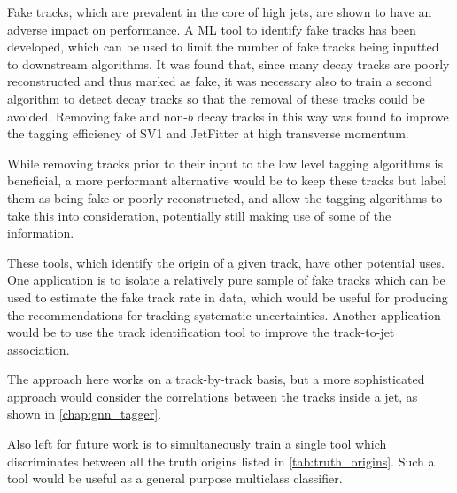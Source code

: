 Fake tracks, which are prevalent in the core of high \pt jets, are shown to have an adverse impact on \btagging performance.
A ML tool to identify fake tracks has been developed, which can be used to limit the number of fake tracks being inputted to downstream \btagging algorithms.
It was found that, since many \bhadron decay tracks are poorly reconstructed and thus marked as fake, it was necessary also to train a second algorithm to detect \bhadron decay tracks so that the removal of these tracks could be avoided.
Removing fake and non-$b$ decay tracks in this way was found to improve the tagging efficiency of SV1 and JetFitter at high transverse momentum.

While removing tracks prior to their input to the low level tagging algorithms is beneficial, a more performant alternative would be to keep these tracks but label them as being fake or poorly reconstructed, and allow the tagging algorithms to take this into consideration, potentially still making use of some of the information.


These tools, which identify the origin of a given track, have other potential uses.
One application is to isolate a relatively pure sample of fake tracks which can be used to estimate the fake track rate in data, which would be useful for producing the recommendations for tracking systematic uncertainties.
Another application would be to use the \bhadron track identification tool to improve the track-to-jet association.

The approach here works on a track-by-track basis, but a more sophisticated approach would consider the correlations between the tracks inside a jet, as shown in \cref{chap:gnn_tagger}.

Also left for future work is to simultaneously train a single tool which discriminates between all the truth origins listed in \cref{tab:truth_origins}.
Such a tool would be useful as a general purpose multiclass classifier.